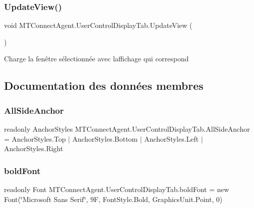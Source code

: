 \subsubsection{\texorpdfstring{Update\+View()}{UpdateView()}}
{\footnotesize\ttfamily void M\+T\+Connect\+Agent.\+User\+Control\+Display\+Tab.\+Update\+View (\begin{DoxyParamCaption}{ }\end{DoxyParamCaption})\hspace{0.3cm}{\ttfamily [inline]}}



Charge la fenêtre sélectionnée avec l\textquotesingle{}affichage qui correspond 



\subsection{Documentation des données membres}
\mbox{\label{class_m_t_connect_agent_1_1_user_control_display_tab_aa600efb65adb7313ed6e5ec98c84863c}} 
\subsubsection{\texorpdfstring{All\+Side\+Anchor}{AllSideAnchor}}
{\footnotesize\ttfamily readonly Anchor\+Styles M\+T\+Connect\+Agent.\+User\+Control\+Display\+Tab.\+All\+Side\+Anchor = Anchor\+Styles.\+Top $\vert$ Anchor\+Styles.\+Bottom $\vert$ Anchor\+Styles.\+Left $\vert$ Anchor\+Styles.\+Right\hspace{0.3cm}{\ttfamily [private]}}

\mbox{\label{class_m_t_connect_agent_1_1_user_control_display_tab_a2de53bacd7b44a121af957bda6d0faa4}} 
\subsubsection{\texorpdfstring{bold\+Font}{boldFont}}
{\footnotesize\ttfamily readonly Font M\+T\+Connect\+Agent.\+User\+Control\+Display\+Tab.\+bold\+Font = new Font(\char`\"{}Microsoft Sans Serif\char`\"{}, 9\+F, Font\+Style.\+Bold, Graphics\+Unit.\+Point, 0)\hspace{0.3cm}{\ttfamily [private]}}

